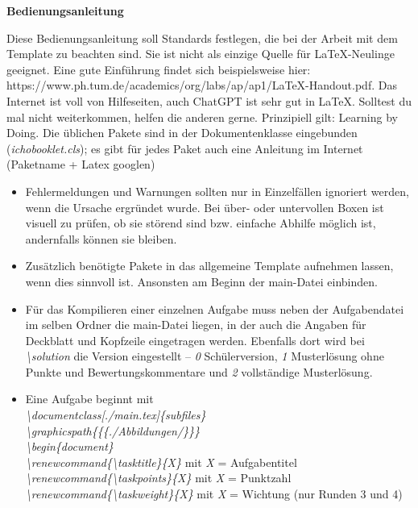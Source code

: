 \documentclass[./main.tex]{subfiles}
\begin{document}
\newpage
{\Large \textbf{Bedienungsanleitung}}\par
Diese Bedienungsanleitung soll Standards festlegen, die bei der Arbeit mit dem Template zu beachten sind. Sie ist nicht als einzige Quelle f\"ur \LaTeX-Neulinge geeignet. Eine gute Einf\"uhrung findet sich beispielsweise hier: https://www.ph.tum.de/academics/org/labs/ap/ap1/LaTeX-Handout.pdf. Das Internet ist voll von Hilfeseiten, auch ChatGPT ist sehr gut in \LaTeX. Solltest du mal nicht weiterkommen, helfen die anderen gerne. Prinzipiell gilt: Learning by Doing. Die \"ublichen Pakete sind in der Dokumentenklasse eingebunden (\textit{ichobooklet.cls}); es gibt f\"ur jedes Paket auch eine Anleitung im Internet (Paketname + Latex googlen)
\begin{itemize}
    \item Fehlermeldungen und Warnungen sollten nur in Einzelf\"allen ignoriert werden, wenn die Ursache ergr\"undet wurde. Bei \"uber- oder untervollen Boxen ist visuell zu pr\"ufen, ob sie st\"orend sind bzw. einfache Abhilfe m\"oglich ist, andernfalls k\"onnen sie bleiben. 
    \item Zus\"atzlich ben\"otigte Pakete in das allgemeine Template aufnehmen lassen, wenn dies sinnvoll ist. Ansonsten am Beginn der main-Datei einbinden. 
    \item F\"ur das Kompilieren einer einzelnen Aufgabe muss neben der Aufgabendatei im selben Ordner die main-Datei liegen, in der auch die Angaben f\"ur Deckblatt und Kopfzeile eingetragen werden. Ebenfalls dort wird bei \hypertarget{solution}{\textit{\textbackslash solution}} die Version eingestellt -- \textit{0} Sch\"ulerversion, \textit{1} Musterl\"osung ohne Punkte und Bewertungskommentare und \textit{2} vollst\"andige Musterl\"osung. 
    \item Eine Aufgabe beginnt mit \\\textit{\textbackslash documentclass[./main.tex]\{subfiles\}\\\textbackslash graphicspath\{\{\subfix\{./Abbildungen/\}\}\}\\\textbackslash begin\{document\}\\\textbackslash renewcommand\{\textbackslash tasktitle\}\{X\}} mit \textit{X} = Aufgabentitel\\\textit{\textbackslash renewcommand\{\textbackslash taskpoints\}\{X\}} mit \textit{X} = Punktzahl\\\textit{\textbackslash renewcommand\{\textbackslash taskweight\}\{X\}} mit \textit{X} = Wichtung (nur Runden 3 und 4)\\

\end{itemize}
\end{document}
